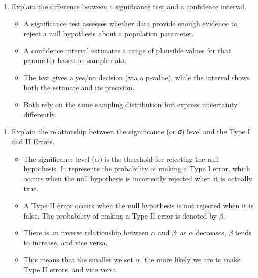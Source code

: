 \documentclass[12pt,a4paper]{article}
\providecommand{\tightlist}{%
  \setlength{\itemsep}{0pt}\setlength{\parskip}{0pt}}
\begin{document}
\bigskip

\begin{enumerate}
\def\labelenumi{\arabic{enumi}.}
\setcounter{enumi}{3}
\tightlist
\item
  Explain the difference between a significance test and a confidence
  interval.

  \begin{itemize}
  \tightlist
  \item
    A significance test assesses whether data provide enough evidence to
    reject a null hypothesis about a population parameter.
  \item
    A confidence interval estimates a range of plausible values for that
    parameter based on sample data.
  \item
    The test gives a yes/no decision (via a p-value), while the interval
    shows both the estimate and its precision.
  \item
    Both rely on the same sampling distribution but express uncertainty
    differently.
  \end{itemize}
\end{enumerate}

\newpage

\begin{enumerate}
\def\labelenumi{\arabic{enumi}.}
\setcounter{enumi}{4}
\tightlist
\item
  Explain the relationship between the significance (or 𝛼) level and the
  Type I and II Errors.

  \begin{itemize}
  \tightlist
  \item
    The significance level (\(\alpha\)) is the threshold for rejecting
    the null hypothesis. It represents the probability of making a Type
    I error, which occurs when the null hypothesis is incorrectly
    rejected when it is actually true.
  \item
    A Type II error occurs when the null hypothesis is not rejected when
    it is false. The probability of making a Type II error is denoted by
    \(\beta\).
  \item
    There is an inverse relationship between \(\alpha\) and \(\beta\);
    as \(\alpha\) decreases, \(\beta\) tends to increase, and vice
    versa.
  \item
    This means that the smaller we set \(\alpha\), the more likely we
    are to make Type II errors, and vice versa.
  \end{itemize}
\end{enumerate}


\printbibliography[title=List of References]
\end{document}
